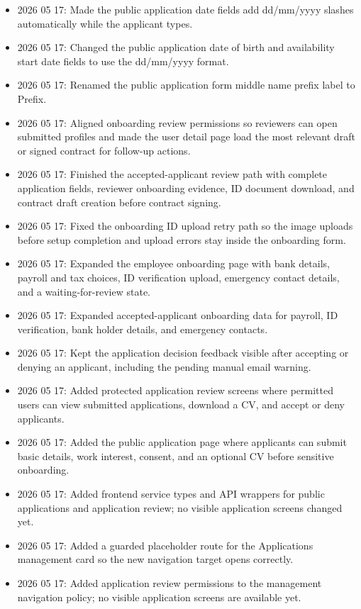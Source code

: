 \documentclass[11pt]{article}
\begin{document}
\begin{itemize}
    \item 2026 05 17: Made the public application date fields add dd/mm/yyyy slashes automatically while the applicant types.
    \item 2026 05 17: Changed the public application date of birth and availability start date fields to use the dd/mm/yyyy format.
    \item 2026 05 17: Renamed the public application form middle name prefix label to Prefix.
    \item 2026 05 17: Aligned onboarding review permissions so reviewers can open submitted profiles and made the user detail page load the most relevant draft or signed contract for follow-up actions.
    \item 2026 05 17: Finished the accepted-applicant review path with complete application fields, reviewer onboarding evidence, ID document download, and contract draft creation before contract signing.
    \item 2026 05 17: Fixed the onboarding ID upload retry path so the image uploads before setup completion and upload errors stay inside the onboarding form.
    \item 2026 05 17: Expanded the employee onboarding page with bank details, payroll and tax choices, ID verification upload, emergency contact details, and a waiting-for-review state.
    \item 2026 05 17: Expanded accepted-applicant onboarding data for payroll, ID verification, bank holder details, and emergency contacts.
    \item 2026 05 17: Kept the application decision feedback visible after accepting or denying an applicant, including the pending manual email warning.
    \item 2026 05 17: Added protected application review screens where permitted users can view submitted applications, download a CV, and accept or deny applicants.
    \item 2026 05 17: Added the public application page where applicants can submit basic details, work interest, consent, and an optional CV before sensitive onboarding.
    \item 2026 05 17: Added frontend service types and API wrappers for public applications and application review; no visible application screens changed yet.
    \item 2026 05 17: Added a guarded placeholder route for the Applications management card so the new navigation target opens correctly.
    \item 2026 05 17: Added application review permissions to the management navigation policy; no visible application screens are available yet.

\end{itemize}
\end{document}
